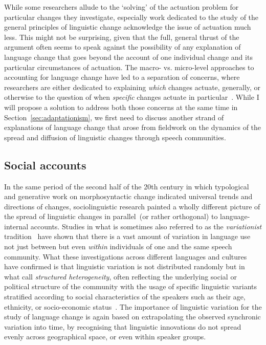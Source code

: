 While some researchers allude to the `solving' of the actuation problem for particular changes they investigate\citep[e.g.][]{Baker2011,Stevens2013}, especially work dedicated to the study of the general principles of linguistic change acknowledge the issue of actuation much less. This might not be surprising, given that the full, general thrust of the argument often seems to speak against the possibility of any explanation of language change that goes beyond the account of one individual change and its particular circumstances of actuation.
The macro- vs. micro-level approaches to accounting for language change have led to a separation of concerns, where researchers are either dedicated to explaining \emph{which} changes actuate, generally, or otherwise to the question of when \emph{specific} changes actuate in particular~\citep{Bynon1977}. While I will propose a solution to address both those concerns at the same time in Section~\ref{sec:adaptationism}, we first need to discuss another strand of explanations of language change that arose from fieldwork on the dynamics of the spread and diffusion of linguistic changes through speech communities.

\subsection{Social accounts}
\label{sec:socialaccounts}

In the same period of the second half of the 20th century in which typological and generative work on morphosyntactic change indicated universal trends and directions of changes, sociolinguistic research %
painted a wholly different picture of the spread of linguistic changes in parallel~(or rather orthogonal) to language-internal accounts.
Studies in what is sometimes also referred to as the \emph{variationist} tradition~\citep{Tagliamonte2015} have shown that there is a vast amount of variation in language use not just between but even \emph{within} individuals of one and the same speech community.
What these investigations across different languages and cultures have confirmed is that linguistic variation is not distributed randomly but in what \citet{Weinreich1968} call \emph{structured heterogeneity}, often reflecting the underlying social or political structure of the community with the usage of specific linguistic variants stratified according to social characteristics of the speakers such as their age, ethnicity, or socio-economic status~\citep{Foulkes2006,Tagliamonte2012}.
The importance of linguistic variation for the study of language change is again based on extrapolating the observed synchronic variation into time, by recognising that linguistic innovations do not spread evenly across geographical space, or even within speaker groups.

